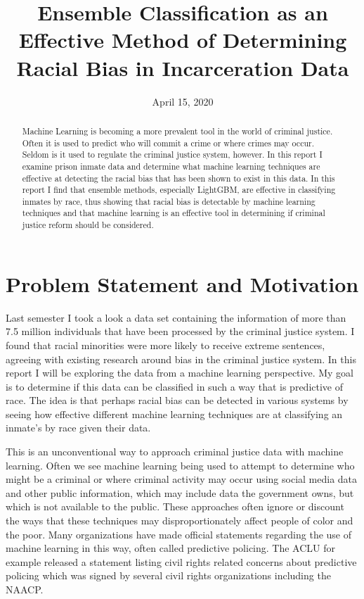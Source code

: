 \documentclass[11pt]{article}
\title{Ensemble Classification as an Effective Method of Determining Racial Bias in Incarceration Data}
\date{April 15, 2020}
\begin{document}
    
    
    \maketitle
    
    

   
    \hypertarget{abstract}{%
\section*{}\label{abstract}}
\begin{abstract}
Machine Learning is becoming a more prevalent tool in the world of
criminal justice. Often it is used to predict who will commit a crime or
where crimes may occur. Seldom is it used to regulate the criminal
justice system, however. In this report I examine prison inmate data
and determine what machine learning techniques are effective at
detecting the racial bias that has been shown to exist in this data. In
this report I find that ensemble methods, especially LightGBM, are effective in classifying inmates by race, thus showing that racial bias is detectable by machine learning techniques and that machine learning is an effective tool in determining if criminal justice reform should be considered. 
\end{abstract}

\hypertarget{problem-statement-and-motivation}{%
\section{Problem Statement and
Motivation}\label{problem-statement-and-motivation}}

Last semester I took a look a data set containing the information of
more than 7.5 million individuals that have been processed by the
criminal justice system. I found that racial minorities were more likely
to receive extreme sentences, agreeing with existing research around
bias in the criminal justice system\cite{me}. In this report I will be exploring
the data from a machine learning perspective. My goal is to determine if
this data can be classified in such a way that is predictive of race.
The idea is that perhaps racial bias can be detected in various systems
by seeing how effective different machine learning techniques are at
classifying an inmate's by race given their data.

This is an unconventional way to approach criminal justice data with
machine learning. Often we see machine learning being used to attempt to
determine who might be a criminal or where criminal activity may occur
using social media data and other public information, which may include
data the government owns, but which is not available to the public. These
approaches often ignore or discount the ways that these techniques may
disproportionately affect people of color and the poor. Many
organizations have made official statements regarding the use of
machine learning in this way, often called predictive policing. The
ACLU for example released a statement listing civil rights related
concerns about predictive policing which was signed by several civil
rights organizations including the NAACP\cite{aclu}.
\end{document}

